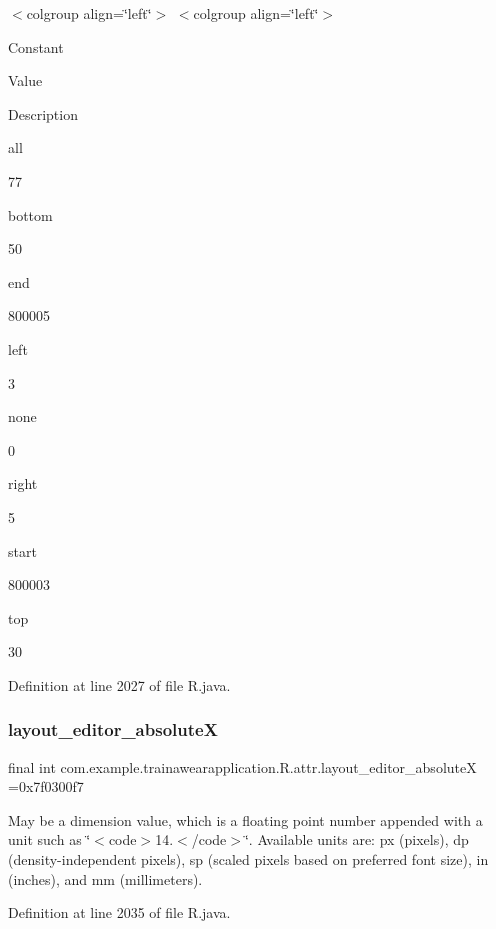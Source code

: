 \tabulinesep=1mm
\begin{longtabu}spread 0pt [c]{*{0}{|X[-1]}|}
\hline
\end{longtabu}
$<$colgroup align=\char`\"{}left\char`\"{}$>$ $<$colgroup align=\char`\"{}left\char`\"{}$>$ 

Constant

Value

Description 

all

77

bottom

50

end

800005

left

3

none

0

right

5

start

800003

top

30

Definition at line 2027 of file R.\+java.

\mbox{\label{classcom_1_1example_1_1trainawearapplication_1_1_r_1_1attr_ad35a5ce68e8bbb2c72dc9ebd44be7125}} 
\subsubsection{\texorpdfstring{layout\_editor\_absoluteX}{layout\_editor\_absoluteX}}
{\footnotesize\ttfamily final int com.\+example.\+trainawearapplication.\+R.\+attr.\+layout\+\_\+editor\+\_\+absoluteX =0x7f0300f7\hspace{0.3cm}{\ttfamily [static]}}

May be a dimension value, which is a floating point number appended with a unit such as \char`\"{}$<$code$>$14.\+5sp$<$/code$>$\char`\"{}. Available units are\+: px (pixels), dp (density-\/independent pixels), sp (scaled pixels based on preferred font size), in (inches), and mm (millimeters). 

Definition at line 2035 of file R.\+java.

